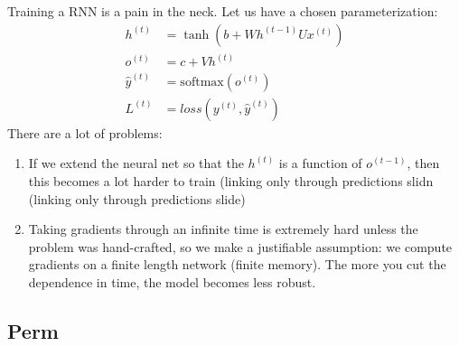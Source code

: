 \documentclass{article}
\theoremstyle{definition}
\theoremstyle{remark}
\theoremstyle{definition}
\begin{document}
Training a RNN is a pain in the neck. Let us have a chosen parameterization: 
\begin{align*} 
    h^{(t)} & = \tanh(b + W h^{(t-1)} U x^{(t)}) \\
    o^{(t)} & = c + V h^{(t)} \\ 
    \hat{y}^{(t)} & = \mathrm{softmax}(o^{(t)}) \\
    L^{(t)} & = loss(y^{(t)}, \hat{y}^{(t)})
\end{align*} 
There are a lot of problems: 
\begin{enumerate}
    \item If we extend the neural net so that the $h^{(t)}$ is a function of $o^{(t-1)}$, then this becomes a lot harder to train (linking only through predictions slidn (linking only through predictions slide) 
    \item Taking gradients through an infinite time is extremely hard unless the problem was hand-crafted, so we make a justifiable assumption: we compute gradients on a finite length network (finite memory). The more you cut the dependence in time, the model becomes less robust.  
\end{enumerate}


\subsection{Perm}
\end{document}
